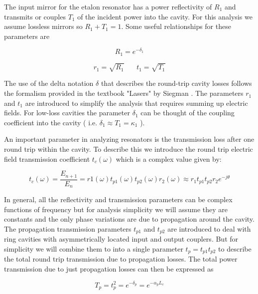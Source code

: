 \documentclass[10pt]{article}
\begin{document}
The input mirror for the etalon resonator has a power reflectivity of $R_1$ and  transmits or couples $T_1$   of the incident power into the cavity.  For this analysis we assume lossless mirrors so $R_1 + T_1 = 1$.  Some useful relationships for these parameters are

\begin{equation}
R_1 = e^{-\delta_1}
\end{equation}

\begin{equation}
  r_1 = \sqrt{ R_1}  ~  ~  ~ ~ ~ ~  ~ ~  t_1 = \sqrt{ T_1}  
\end{equation}
 
The use of the delta notation $\delta$ that describes the round-trip cavity losses follows the formalism provided in the textbook "Lasers" by Siegman \cite{Siegman1986}.  The parameters $r_1$ and $t_1$ are introduced to simplify the analysis that requires summing up electric fields.     For low-loss cavities the parameter $\delta_1$ can be thought of the coupling coefficient into the cavity ( i.e. $   \delta_1 \approx T_1 = \kappa_1$ ).    



An important parameter in analyzing resonators is the transmission loss after one round trip within the cavity.   To describe this we introduce the round trip electric field transmission coefficient $t_c (\omega)$  which is a complex value given by:

\begin{equation}
  t_c (\omega) = \frac{E_{n+1}}{E_n}  = r1(\omega) t_{p1}(\omega) t_{p2}(\omega)r_2(\omega) \approx r_1 t_{p1} t_{p2} r_2 e^{-j\theta}
\label{equ:tc}
\end{equation}

\noindent In general, all the reflectivity and transmission parameters can be complex functions of frequency but for analysis  simplicity we will assume they are constants and the only phase variations are due to propagation around the cavity.   The propagation transmission parameters $t_{p1}$ and $t_{p2}$ are introduced to deal with ring cavities with asymmetrically located input and output couplers. But for simplicity we will combine them to into a single parameter $t_p = t_{p1} t_{p2}$ to describe the total round trip transmission due to  propagation losses.  The total power transmission due to just propagation losses can then be expressed as 


\begin{equation}
T_p = t_p^2 = e^{-\delta_{p}}= e^{-\alpha_p L_c}  
\end{equation}
\end{document}
